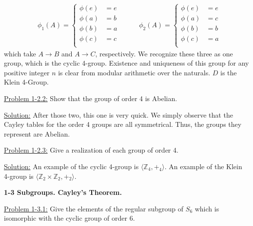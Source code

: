 \documentclass[12pt]{article}
\begin{document}
\begin{align*}
    &\phi_1(A) = \begin{cases}
                \phi(e) &= e\\
                \phi(a) &= b\\
                \phi(b) &= a\\
                \phi(c) &= c\\
                \end{cases} \quad \quad 
    &\phi_2(A) = \begin{cases}
                \phi(e) &= e\\
                \phi(a) &= c\\
                \phi(b) &= b\\
                \phi(c) &= a\\
                \end{cases}
\end{align*}
which take $A \rightarrow B$ and $A \rightarrow C$, respectively. We recognize
these three as one group, which is the cyclic 4-group. Existence and uniqueness
of this group for any positive integer $n$ is clear from modular arithmetic
over the naturals. $D$ is the Klein 4-Group.

\underline{Problem 1-2.2:} Show that the group of order 4 is Abelian.

\underline{Solution:} After those two, this one is very quick. We simply
observe that the Cayley tables for the order 4 groups are all symmetrical.
Thus, the groups they represent are Abelian.

\underline{Problem 1-2.3:} Give a realization of each group of order 4.

\underline{Solution:} An example of the cyclic 4-group is
$\langle \mathbb{Z}_4 , +_4 \rangle$. An example of the Klein 4-group is
$\langle \mathbb{Z}_2 \times \mathbb{Z}_2 , +_2 \rangle $.

\newpage

\textbf{1-3 Subgroups. Cayley's Theorem.}

\underline{Problem 1-3.1:} Give the elements of the regular subgroup of $S_6$
which is isomorphic with the cyclic group of order 6.
\end{document}
